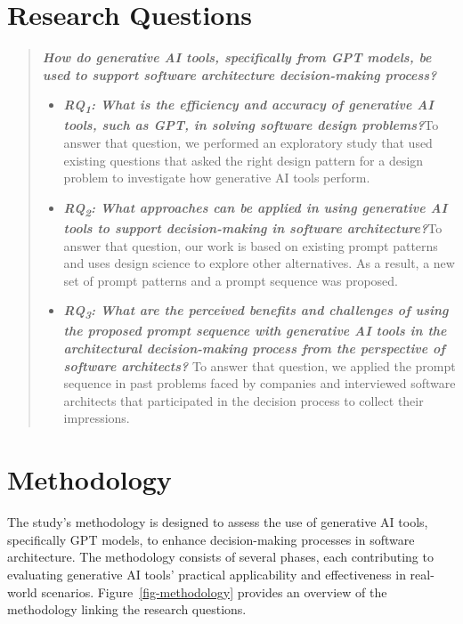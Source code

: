 \section{Research Questions}\label{sec:research-questions}
\begin{quote}
\textbf{\textit{How do generative AI tools, specifically from GPT models, be used to support software architecture decision-making process?}}

\begin{itemize}
    \item  \textbf{\textit{RQ\textsubscript{1}: What is the efficiency and accuracy of generative AI tools, such as GPT, in solving software design problems?}}\newline To answer that question, we performed an exploratory study that used existing questions that asked the right design pattern for a design problem to investigate how generative AI tools perform.
    \item \textbf{\textit{RQ\textsubscript{2}: What approaches can be applied in using generative AI tools to support decision-making in software architecture?}}\newline To answer that question, our work is based on existing prompt patterns and uses design science to explore other alternatives. As a result, a new set of prompt patterns and a prompt sequence was proposed.
    \item \textbf{\textit{RQ\textsubscript{3}: What are the perceived benefits and challenges of using the proposed prompt sequence with generative AI tools in the architectural decision-making process from the perspective of software architects?}} \newline To answer that question, we applied the prompt sequence in past problems faced by companies and interviewed software architects that participated in the decision process to collect their impressions.   
\end{itemize}
\end{quote}

\section{Methodology}\label{sec:methodology}
The study's methodology is designed to assess the use of generative AI tools, specifically GPT models, to enhance decision-making processes in software architecture. The methodology consists of several phases, each contributing to evaluating generative AI tools' practical applicability and effectiveness in real-world scenarios. Figure~\ref{fig-methodology} provides an overview of the methodology linking the research questions.

